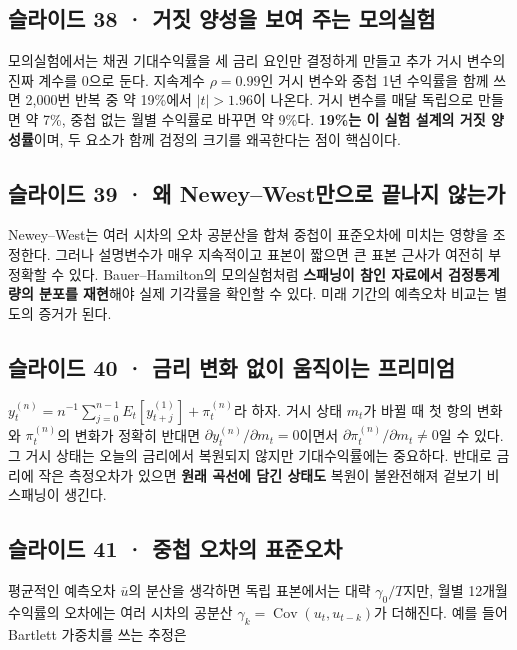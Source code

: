 \documentclass[11pt,a4paper]{article}
\begin{document}
\subsection{슬라이드 38 · 거짓 양성을 보여 주는 모의실험}
모의실험에서는 채권 기대수익률을 세 금리 요인만 결정하게 만들고 추가 거시 변수의 진짜 계수를 0으로 둔다. 지속계수 $\rho=0.99$인 거시 변수와 중첩 1년 수익률을 함께 쓰면 2,000번 반복 중 약 19\%에서 $|t|>1.96$이 나온다. 거시 변수를 매달 독립으로 만들면 약 7\%, 중첩 없는 월별 수익률로 바꾸면 약 9\%다. \textbf{19\%는 이 실험 설계의 거짓 양성률}이며, 두 요소가 함께 검정의 크기를 왜곡한다는 점이 핵심이다.\par

\subsection{슬라이드 39 · 왜 Newey–West만으로 끝나지 않는가}
Newey–West는 여러 시차의 오차 공분산을 합쳐 중첩이 표준오차에 미치는 영향을 조정한다. 그러나 설명변수가 매우 지속적이고 표본이 짧으면 큰 표본 근사가 여전히 부정확할 수 있다. Bauer–Hamilton의 모의실험처럼 \textbf{스패닝이 참인 자료에서 검정통계량의 분포를 재현}해야 실제 기각률을 확인할 수 있다. 미래 기간의 예측오차 비교는 별도의 증거가 된다.\par

\subsection{슬라이드 40 · 금리 변화 없이 움직이는 프리미엄}
$y_t^{(n)}=n^{-1}\sum_{j=0}^{n-1}E_t[y_{t+j}^{(1)}]+\pi_t^{(n)}$라 하자. 거시 상태 $m_t$가 바뀔 때 첫 항의 변화와 $\pi_t^{(n)}$의 변화가 정확히 반대면 $\partial y_t^{(n)}/\partial m_t=0$이면서 $\partial\pi_t^{(n)}/\partial m_t\neq0$일 수 있다. 그 거시 상태는 오늘의 금리에서 복원되지 않지만 기대수익률에는 중요하다. 반대로 금리에 작은 측정오차가 있으면 \textbf{원래 곡선에 담긴 상태도} 복원이 불완전해져 겉보기 비스패닝이 생긴다.\par

\subsection{슬라이드 41 · 중첩 오차의 표준오차}
평균적인 예측오차 $\bar u$의 분산을 생각하면 독립 표본에서는 대략 $\gamma_0/T$지만, 월별 12개월 수익률의 오차에는 여러 시차의 공분산 $\gamma_k=\operatorname{Cov}(u_t,u_{t-k})$가 더해진다. 예를 들어 Bartlett 가중치를 쓰는 추정은\par
\end{document}
